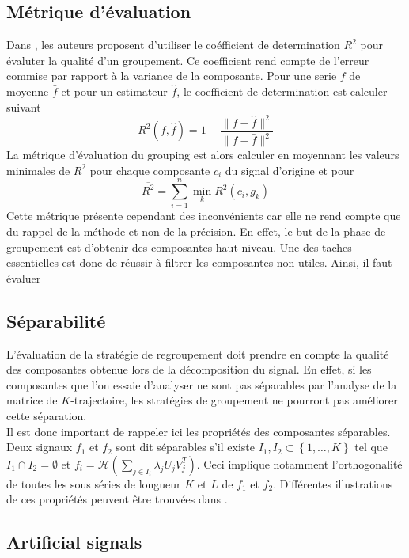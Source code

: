 \documentclass{gretsi}
\begin{document}
\subsection{Métrique d'évaluation}
\label{sub:}
Dans \cite{abalov_14_aut}, les auteurs proposent d'utiliser le coéfficient de determination $R^2$ pour évaluter la qualité d'un groupement. Ce coefficient rend compte de l'erreur commise par rapport à la variance de la composante. Pour une serie $f$ de moyenne $\bar f$ et pour un estimateur $\hat f$, le coefficient de determination est calculer suivant$$
R^2(f, \hat f) = 1 - \frac{\|f-\hat f\|^2}{\|f-\bar f\|^2}
$$ La métrique d'évaluation du grouping est alors calculer  en moyennant les valeurs minimales de $R^2$ pour chaque composante $c_i$ du signal d'origine et pour $$
\overline{ R^2} = \sum_{i=1}^n \min_k R^2(c_i, g_k)
$$Cette métrique présente cependant des inconvénients car elle ne rend compte que du rappel de la méthode et non de la précision. En effet, le but de la phase de groupement est d'obtenir des composantes haut niveau. Une des taches essentielles est donc de réussir à filtrer les composantes non utiles. Ainsi, il faut évaluer


\subsection{Séparabilité}
\label{sub:sep}
    L'évaluation de la stratégie de regroupement doit prendre en compte la qualité des composantes obtenue lors de la décomposition du signal. En effet, si les composantes que l'on essaie d'analyser ne sont pas séparables par l'analyse de la matrice de $K$-trajectoire, les stratégies de groupement ne pourront pas améliorer cette séparation.\\
    
    Il est donc important de rappeler ici les propriétés des composantes séparables. Deux signaux $f_1$ et $f_2$ sont dit séparables s'il existe $I_1, I_2 \subset \left \{ 1,\dots, K \right \}$ tel que $I_1\cap I_2 = \emptyset$ et $f_i = \mathcal H(\sum_{j \in I_i} \lambda_j U_j V_j^T)$. Ceci implique notamment l'orthogonalité de toutes les sous séries de longueur $K$ et $L$ de $f_1$ et $f_2$. Différentes illustrations de ces propriétés peuvent être trouvées dans \cite{GNZ_10_SSA}.


\subsection{Artificial signals}
\label{sub:}
\end{document}
